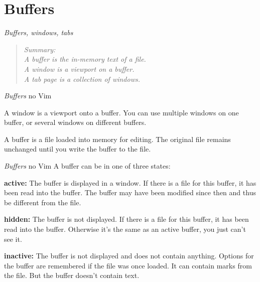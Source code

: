 \section{Buffers}
\begin{frame}{\textit{Buffers, windows, tabs}}
  \begin{widedescription}
    \item \begin{quotation} \small\it
      Summary: \\
      \hspace{1em} A buffer is the in-memory text of a file. \\
      \hspace{1em} A window is a viewport on a buffer. \\
      \hspace{1em} A tab page is a collection of windows\cite{vimReferenceManual}. \\
    \end{quotation}
  \end{widedescription}
\end{frame}

\begin{frame}{\textit{Buffers} no Vim}
  \begin{widedescription}
    \item A window is a viewport onto a buffer.  You can use multiple windows on one buffer, or several windows on different buffers.
    \item A buffer is a file loaded into memory for editing.  The original file remains unchanged until you write the buffer to the file\cite{vimReferenceManual}.
  \end{widedescription}
\end{frame}

\begin{frame}{\textit{Buffers} no Vim}
  A buffer can be in one of three states:
  \begin{widedescription}
    \item \textbf{active:} The buffer is displayed in a window. If there is a file for this buffer, it has been read 
      into the buffer. The buffer may have been modified since then and thus be different from the file.

    \item \textbf{hidden:} The buffer is not displayed. If there is a file for this buffer, it has been read into the
      buffer. Otherwise it's the same as an active buffer, you just can't see it.

    \item \textbf{inactive:} The buffer is not displayed and does not contain anything. Options for the buffer are
      remembered if the file was once loaded. It can contain marks from the  file.  But the buffer
      doesn't contain text\cite{vimReferenceManual}.
  \end{widedescription}
\end{frame}

